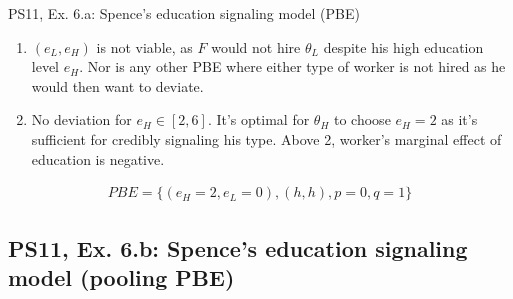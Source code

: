 \begin{frame}{PS11, Ex. 6.a: Spence’s education signaling model (PBE)}
\begin{multicols}{2}
      \begin{enumerate}
        \item $(e_L,e_H)$ is not viable, as $F$ would not hire $\theta_L$ despite his high education level $e_H$. Nor is any other PBE where either type of worker is not hired as he would then want to deviate.
        \item No deviation for $e_H\in[2,6]$. It's optimal for $\theta_H$ to choose $e_H=2$ as it's sufficient for credibly signaling his type. Above 2, worker's marginal effect of education is negative.
      \end{enumerate}\vspace{-12pt}
      \begin{align*}
        PBE=\{(e_H=2,e_L=0),(h,h),p=0,q=1\}
      \end{align*}
      \vfill\null
    \end{multicols}
\end{frame}


\subsection{PS11, Ex. 6.b: Spence’s education signaling model (pooling PBE)}

